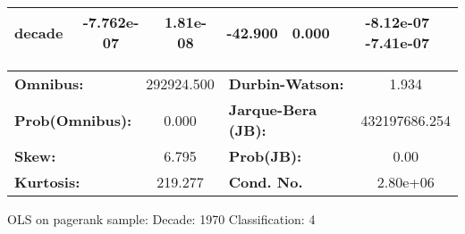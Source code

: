 \begin{center}
\begin{tabular}{lccccc}
\textbf{decade}             &   -7.762e-07  &     1.81e-08     &   -42.900  &         0.000        &     -8.12e-07 -7.41e-07       \\
\bottomrule
\end{tabular}
\begin{tabular}{lclc}
\textbf{Omnibus:}       & 292924.500 & \textbf{  Durbin-Watson:     } &       1.934    \\
\textbf{Prob(Omnibus):} &    0.000   & \textbf{  Jarque-Bera (JB):  } & 432197686.254  \\
\textbf{Skew:}          &    6.795   & \textbf{  Prob(JB):          } &        0.00    \\
\textbf{Kurtosis:}      &  219.277   & \textbf{  Cond. No.          } &    2.80e+06    \\
\bottomrule
\end{tabular}
\end{center}
\break
OLS on pagerank sample: Decade: 1970 Classification: 4
